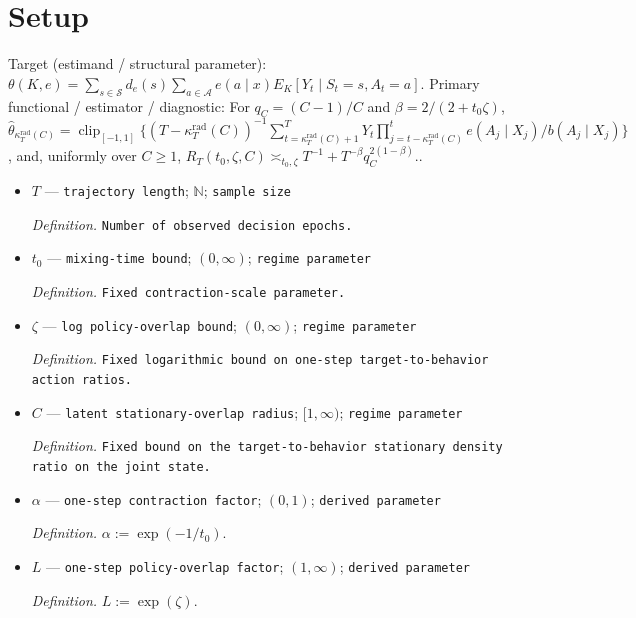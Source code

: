 \documentclass{article}
\begin{document}
\section{Setup}

Target (estimand / structural parameter): \(\theta(K,e)=\sum_{s\in\mathcal S}d_e(s)\sum_{a\in\mathcal A}e(a\mid x)E_K[Y_t\mid S_t=s,A_t=a]\).
Primary functional / estimator / diagnostic: For \(q_C=(C-1)/C\) and \(\beta=2/(2+t_0\zeta)\), \(\widehat\theta_{\kappa_T^{\mathrm{rad}}(C)}=\operatorname{clip}_{[-1,1]}\{(T-\kappa_T^{\mathrm{rad}}(C))^{-1}\sum_{t=\kappa_T^{\mathrm{rad}}(C)+1}^{T}Y_t\prod_{j=t-\kappa_T^{\mathrm{rad}}(C)}^{t}e(A_j\mid X_j)/b(A_j\mid X_j)\}\), and, uniformly over \(C\ge1\), \(R_T(t_0,\zeta,C)\asymp_{t_0,\zeta}T^{-1}+T^{-\beta}q_C^{2(1-\beta)}\)..
\begin{itemize}
  \item \(T\) --- \texttt{trajectory length}; \(\mathbb N\); \texttt{sample size}
  \par\smallskip\noindent\emph{Definition.} \texttt{Number of observed decision epochs.}
  \item \(t_0\) --- \texttt{mixing-\allowbreak{}time bound}; \((0,\infty)\); \texttt{regime parameter}
  \par\smallskip\noindent\emph{Definition.} \texttt{Fixed contraction-\allowbreak{}scale parameter.}
  \item \(\zeta\) --- \texttt{log policy-\allowbreak{}overlap bound}; \((0,\infty)\); \texttt{regime parameter}
  \par\smallskip\noindent\emph{Definition.} \texttt{Fixed logarithmic bound on one-\allowbreak{}step target-\allowbreak{}to-\allowbreak{}behavior action ratios.}
  \item \(C\) --- \texttt{latent stationary-\allowbreak{}overlap radius}; \([1,\infty)\); \texttt{regime parameter}
  \par\smallskip\noindent\emph{Definition.} \texttt{Fixed bound on the target-\allowbreak{}to-\allowbreak{}behavior stationary density ratio on the joint state.}
  \item \(\alpha\) --- \texttt{one-\allowbreak{}step contraction factor}; \((0,1)\); \texttt{derived parameter}
  \par\smallskip\noindent\emph{Definition.} \(\alpha:=\exp(-1/t_0)\).
  \item \(L\) --- \texttt{one-\allowbreak{}step policy-\allowbreak{}overlap factor}; \((1,\infty)\); \texttt{derived parameter}
  \par\smallskip\noindent\emph{Definition.} \(L:=\exp(\zeta)\).

\end{itemize}
\end{document}
